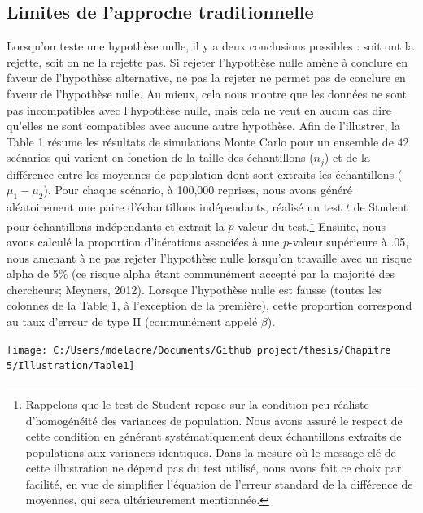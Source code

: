 \documentclass[
  english,
  man]{apa6}
\begin{document}
\hypertarget{limites-de-lapproche-traditionnelle}{%
\subsection{Limites de l'approche traditionnelle}\label{limites-de-lapproche-traditionnelle}}

Lorsqu'on teste une hypothèse nulle, il y a deux conclusions possibles : soit ont la rejette, soit on ne la rejette pas. Si rejeter l'hypothèse nulle amène à conclure en faveur de l'hypothèse alternative, ne pas la rejeter ne permet pas de conclure en faveur de l'hypothèse nulle. Au mieux, cela nous montre que les données ne sont pas incompatibles avec l'hypothèse nulle, mais cela ne veut en aucun cas dire qu'elles ne sont compatibles avec aucune autre hypothèse. Afin de l'illustrer, la Table 1 résume les résultats de simulations Monte Carlo pour un ensemble de 42 scénarios qui varient en fonction de la taille des échantillons (\(n_j\)) et de la différence entre les moyennes de population dont sont extraits les échantillons (\(\mu_1-\mu_2\)). Pour chaque scénario, à 100,000 reprises, nous avons généré aléatoirement une paire d'échantillons indépendants, réalisé un test \(t\) de Student pour échantillons indépendants et extrait la \(p\)-valeur du test.\footnote{Rappelons que le test de Student repose sur la condition peu réaliste d'homogénéité des variances de population. Nous avons assuré le respect de cette condition en générant systématiquement deux échantillons extraits de populations aux variances identiques. Dans la mesure où le message-clé de cette illustration ne dépend pas du test utilisé, nous avons fait ce choix par facilité, en vue de simplifier l'équation de l'erreur standard de la différence de moyennes, qui sera ultérieurement mentionnée.} Ensuite, nous avons calculé la proportion d'itérations associées à une \(p\)-valeur supérieure à .05, nous amenant à ne pas rejeter l'hypothèse nulle lorsqu'on travaille avec un risque alpha de 5\% (ce risque alpha étant communément accepté par la majorité des chercheurs; Meyners, 2012). Lorsque l'hypothèse nulle est fausse (toutes les colonnes de la Table 1, à l'exception de la première), cette proportion correspond au taux d'erreur de type II (communément appelé \(\beta\)).

\begin{flushleft}\texttt{[image: C:/Users/mdelacre/Documents/Github project/thesis/Chapitre 5/Illustration/Table1]} \end{flushleft}
\newpage
\end{document}
